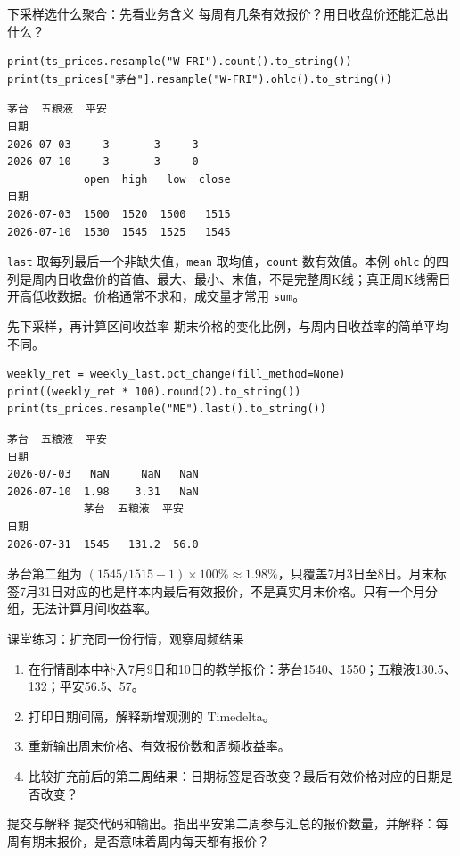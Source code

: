 \documentclass[9pt]{ctexbeamer}
\begin{document}
\begin{frame}[fragile]{下采样选什么聚合：先看业务含义}
\small 每周有几条有效报价？用日收盘价还能汇总出什么？
\medskip
\begin{lstlisting}
print(ts_prices.resample("W-FRI").count().to_string())
print(ts_prices["茅台"].resample("W-FRI").ohlc().to_string())
\end{lstlisting}
\begin{lstlisting}[language={},numbers=none,basicstyle=\ttfamily\scriptsize]
            茅台  五粮液  平安
日期
2026-07-03     3       3     3
2026-07-10     3       3     0
            open  high   low  close
日期
2026-07-03  1500  1520  1500   1515
2026-07-10  1530  1545  1525   1545
\end{lstlisting}
\small \texttt{last} 取每列最后一个非缺失值，\texttt{mean} 取均值，\texttt{count} 数有效值。本例 \texttt{ohlc} 的四列是周内日收盘价的首值、最大、最小、末值，\alert{不是完整周K线}；真正周K线需日开高低收数据。价格通常不求和，成交量才常用 \texttt{sum}。
\end{frame}

\begin{frame}[fragile]{先下采样，再计算区间收益率}
\small 期末价格的变化比例，与周内日收益率的简单平均不同。
\medskip
\begin{lstlisting}
weekly_ret = weekly_last.pct_change(fill_method=None)
print((weekly_ret * 100).round(2).to_string())
print(ts_prices.resample("ME").last().to_string())
\end{lstlisting}
\begin{lstlisting}[language={},numbers=none,basicstyle=\ttfamily\scriptsize]
            茅台  五粮液  平安
日期
2026-07-03   NaN     NaN   NaN
2026-07-10  1.98    3.31   NaN
            茅台  五粮液  平安
日期
2026-07-31  1545   131.2  56.0
\end{lstlisting}
\small 茅台第二组为 $(1545/1515-1)\times100\%\approx1.98\%$，只覆盖7月3日至8日。月末标签7月31日对应的也是样本内最后有效报价，不是真实月末价格。只有一个月分组，无法计算月间收益率。
\end{frame}

\begin{frame}[fragile]{课堂练习：扩充同一份行情，观察周频结果}
\begin{enumerate}
\item 在行情副本中补入7月9日和10日的教学报价：茅台1540、1550；五粮液130.5、132；平安56.5、57。
\item 打印日期间隔，解释新增观测的 Timedelta。
\item 重新输出周末价格、有效报价数和周频收益率。
\item 比较扩充前后的第二周结果：日期标签是否改变？最后有效价格对应的日期是否改变？
\end{enumerate}
\begin{block}{提交与解释}
提交代码和输出。指出平安第二周参与汇总的报价数量，并解释：每周有期末报价，是否意味着周内每天都有报价？
\end{block}
\end{frame}
\end{document}
